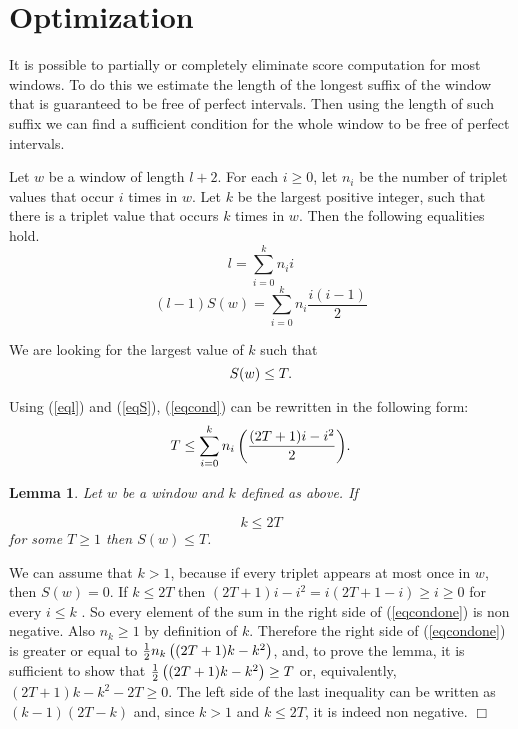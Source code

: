 \documentclass{article}
\newtheorem{lemma}{Lemma}
\begin{document}
\section{Optimization}

It is possible to partially or completely eliminate score computation for most 
windows.  To do this we estimate the length of the longest suffix of the window 
that is guaranteed to be free of perfect intervals. Then using the length of 
such suffix we can find a sufficient condition for the whole window to be free 
of perfect intervals.

Let $w$ be a window of length $l+2$. For each $i \ge 0$, let $n_i$ be the number 
of triplet values that occur $i$ times in $w$.  Let $k$ be the largest positive 
integer, such that there is a triplet value that occurs $k$ times in $w$.  Then 
the following equalities hold.
\begin{equation}\label{eql}
l = \sum_{i=0}^k{n_ii}
\end{equation}
\begin{equation}\label{eqS}
(l-1)S(w) = \sum_{i=0}^k{n_i\frac{i(i-1)}{2}}
\end{equation}

We are looking for the largest value of $k$ such that
\begin{equation}\label{eqcond}
S(w) \le T{\rm .}
\end{equation}

Using (\ref{eql}) and (\ref{eqS}), (\ref{eqcond}) can be rewritten in the following
form:
\begin{equation}\label{eqcondone}
T \le \sum_{i=0}^k{n_i\left(\frac{(2T+1)i - i^2}{2}\right)}{\rm .}
\end{equation}

\begin{lemma}
Let $w$ be a window and $k$ defined as above. If 

\begin{equation}\label{eqsuff}
k \le 2T
\end{equation}
for some $T \ge 1$ then $S(w) \le T$.
\end{lemma}

\proof We can assume that $k > 1$, because if every triplet appears at most once 
in $w$, then $S(w) = 0$. If $k \le 2T$ then 
$(2T + 1)i - i^2 = i( 2T + 1 - i ) \ge i \ge 0$ for every $i \le k$ . So every
element of the sum in the right side of (\ref{eqcondone}) is non negative.
Also $n_k \ge 1$ by definition of $k$. Therefore the right side of 
(\ref{eqcondone}) is greater or equal to 
${1\over2}n_k\left((2T + 1)k - k^2\right)$, and, to prove the lemma, it is 
sufficient to show that ${1\over2}\left((2T + 1)k - k^2\right) \ge T$ or,
equivalently, $(2T + 1)k - k^2 - 2T \ge 0$. The left side of the last inequality
can be written as $(k - 1)(2T - k)$ and, since $k > 1$ and $k \le 2T$, it is
indeed non negative. $\Box$
\end{document}
